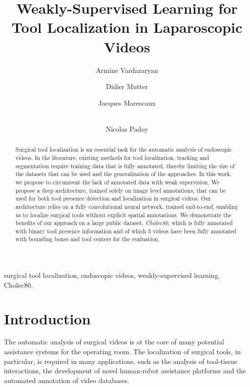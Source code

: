 \documentclass[english,runningheads,a4paper]{llncs}
\begin{document}
\title{Weakly-Supervised Learning for Tool Localization in Laparoscopic Videos}

\author{Armine Vardazaryan
\and Didier Mutter
\and Jacques Marescaux
\and \\Nicolas Padoy}


\maketitle

\begin{abstract}
Surgical tool localization is an essential task for the automatic analysis of endoscopic videos. In the literature, existing methods for tool localization, tracking and segmentation require training data that is fully annotated, thereby limiting the size of the datasets that can be used and the generalization of the approaches. In this work, we propose to circumvent the lack of annotated data with weak supervision. We propose a deep architecture, trained solely on image level annotations, that can be used for both tool presence detection and localization in surgical videos. Our architecture relies on a fully convolutional neural network, trained end-to-end, enabling us to localize surgical tools without explicit spatial annotations. We demonstrate the benefits of our approach on a large public dataset, \textit{Cholec80}, which is fully annotated with binary tool presence information and of which 5 videos have been fully annotated with bounding boxes and tool centers for the evaluation.
\end{abstract}

\begin{keywords}
surgical tool localization, endoscopic videos, weakly-supervised learning, Cholec80.
\end{keywords}

\section{Introduction}
The automatic analysis of surgical videos is at the core of many potential assistance systems for the operating room. The localization of surgical tools, in particular, is required in many applications, such as the analysis of tool-tissue interactions, the development of novel human-robot assistance platforms and the automated annotation of video databases.
\end{document}

